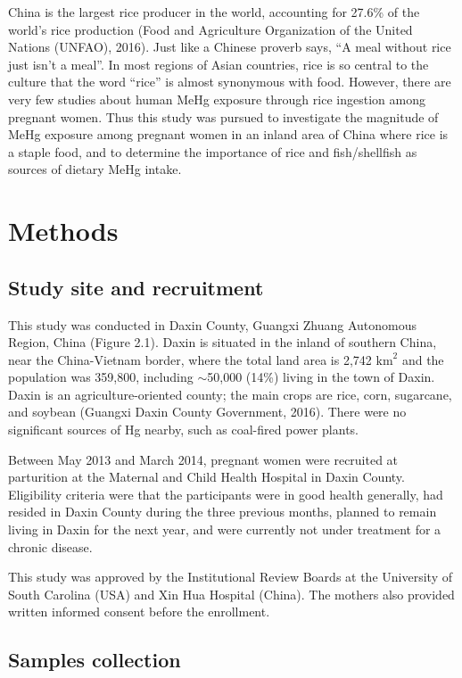 China is the largest rice producer in the world, accounting for 27.6\% of the world's rice production (Food and Agriculture Organization of the United Nations (UNFAO), 2016). Just like a Chinese proverb says, ``A meal without rice just isn't a meal''. In most regions of Asian countries, rice is so central to the culture that the word ``rice'' is almost synonymous with food. However, there are very few studies about human MeHg exposure through rice ingestion among pregnant women. Thus this study was pursued to investigate the magnitude of MeHg exposure among pregnant women in an inland area of China where rice is a staple food, and to determine the importance of rice and fish/shellfish as sources of dietary MeHg intake.

\section{Methods}

\subsection{Study site and recruitment}

This study was conducted in Daxin County, Guangxi Zhuang Autonomous Region, China (Figure 2.1). Daxin is situated in the inland of southern China, near the China-Vietnam border, where the total land area is 2,742 \(\text{km}^{2}\) and the population was 359,800, including \({\sim}\)50,000 (14\%) living in the town of Daxin. Daxin is an agriculture-oriented county; the main crops are rice, corn, sugarcane, and soybean (Guangxi Daxin County Government, 2016). There were no significant sources of Hg nearby, such as coal-fired power plants.

Between May 2013 and March 2014, pregnant women were recruited at parturition at the Maternal and Child Health Hospital in Daxin County. Eligibility criteria were that the participants were in good health generally, had resided in Daxin County during the three previous months, planned to remain living in Daxin for the next year, and were currently not under treatment for a chronic disease. 

This study was approved by the Institutional Review Boards at the University of South Carolina (USA) and Xin Hua Hospital (China). The mothers also provided written informed consent before the enrollment. 

\subsection{Samples collection}

